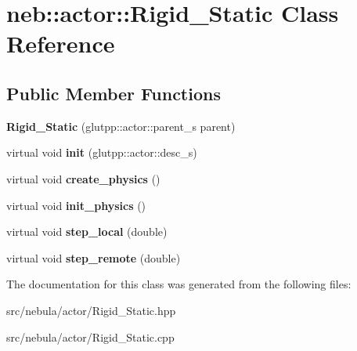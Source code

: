 \hypertarget{classneb_1_1actor_1_1Rigid__Static}{
\section{neb::actor::Rigid\_\-Static Class Reference}
\label{classneb_1_1actor_1_1Rigid__Static}
}
\subsection*{Public Member Functions}
\begin{DoxyCompactItemize}
\item 
\hypertarget{classneb_1_1actor_1_1Rigid__Static_a966402830e96d2a4982a845a6352b0ee}{
{\bfseries Rigid\_\-Static} (glutpp::actor::parent\_\-s parent)}
\label{classneb_1_1actor_1_1Rigid__Static_a966402830e96d2a4982a845a6352b0ee}

\item 
\hypertarget{classneb_1_1actor_1_1Rigid__Static_ab7d84259cceef7f16b9834de1ef1f2d9}{
virtual void {\bfseries init} (glutpp::actor::desc\_\-s)}
\label{classneb_1_1actor_1_1Rigid__Static_ab7d84259cceef7f16b9834de1ef1f2d9}

\item 
\hypertarget{classneb_1_1actor_1_1Rigid__Static_a9e8eec801df7d03445a9b4dd01fb8d67}{
virtual void {\bfseries create\_\-physics} ()}
\label{classneb_1_1actor_1_1Rigid__Static_a9e8eec801df7d03445a9b4dd01fb8d67}

\item 
\hypertarget{classneb_1_1actor_1_1Rigid__Static_a33c50f89376464b5f9ff2c0299fc211c}{
virtual void {\bfseries init\_\-physics} ()}
\label{classneb_1_1actor_1_1Rigid__Static_a33c50f89376464b5f9ff2c0299fc211c}

\item 
\hypertarget{classneb_1_1actor_1_1Rigid__Static_afca31b618b88aa4b20ca578a0a1e3a75}{
virtual void {\bfseries step\_\-local} (double)}
\label{classneb_1_1actor_1_1Rigid__Static_afca31b618b88aa4b20ca578a0a1e3a75}

\item 
\hypertarget{classneb_1_1actor_1_1Rigid__Static_a044fc1ffd31ca296271b00021a934ed6}{
virtual void {\bfseries step\_\-remote} (double)}
\label{classneb_1_1actor_1_1Rigid__Static_a044fc1ffd31ca296271b00021a934ed6}

\end{DoxyCompactItemize}


The documentation for this class was generated from the following files:\begin{DoxyCompactItemize}
\item 
src/nebula/actor/Rigid\_\-Static.hpp\item 
src/nebula/actor/Rigid\_\-Static.cpp\end{DoxyCompactItemize}
